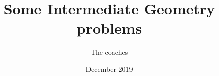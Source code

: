 \documentclass[a4paper,12pt]{article}
\begin{document}
\title {Some Intermediate Geometry problems}
\author{The coaches}
\date{December 2019}
\maketitle

\begin{itemize}

\end{itemize}
\end{document}
